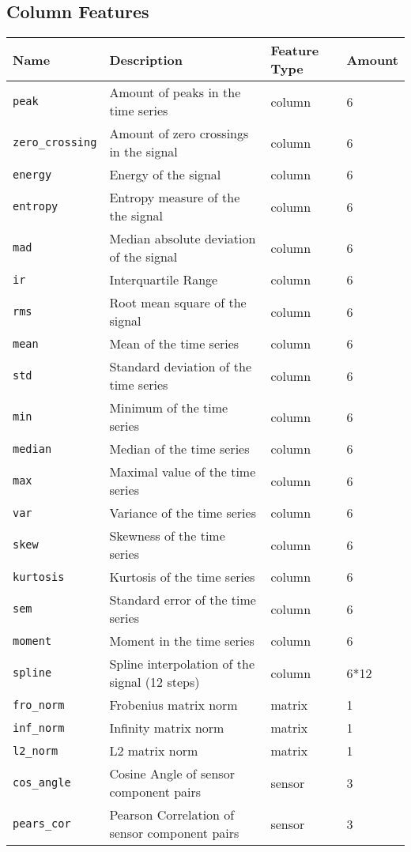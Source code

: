 \subsection{Column Features}
\begin{center}
  \begin{tabular}{ | l| l | l | l |}
  \hline
  Name & Description & Feature Type & Amount \\
  \hline
    \texttt{peak} & Amount of peaks in the time series & column  & 6 \\
    \texttt{zero\_crossing} & Amount of zero crossings in the signal & column  & 6 \\ 
    \texttt{energy} & Energy of the signal & column  & 6 \\ 
    \texttt{entropy} & Entropy measure of the the signal & column  & 6 \\
    \texttt{mad} & Median absolute deviation of the signal & column  & 6 \\
    \texttt{ir} & Interquartile Range & column  & 6 \\
    \texttt{rms} & Root mean square of the signal & column  & 6 \\
    \texttt{mean} & Mean of the time series & column  & 6 \\
    \texttt{std} & Standard deviation of the time series & column  & 6 \\
    \texttt{min} & Minimum of the time series & column  & 6 \\
    \texttt{median} & Median of the time series & column  & 6 \\
    \texttt{max} & Maximal value of the time series & column  & 6 \\
    \texttt{var} & Variance of the time series & column  & 6 \\
    \texttt{skew} & Skewness of the time series & column  & 6 \\
    \texttt{kurtosis} & Kurtosis of the time series & column  & 6 \\
    \texttt{sem} & Standard error of the time series & column  & 6 \\
    \texttt{moment} & Moment in the time series & column & 6 \\
    \texttt{spline} & Spline interpolation of the signal (12 steps) & column  & 6*12 \\
  \hline
    \texttt{fro\_norm} & Frobenius matrix norm & matrix & 1 \\
    \texttt{inf\_norm} & Infinity matrix norm & matrix & 1 \\
    \texttt{l2\_norm} & L2 matrix norm & matrix & 1 \\
  \hline
    \texttt{cos\_angle} & Cosine Angle of sensor component pairs & sensor & 3 \\
    \texttt{pears\_cor} & Pearson Correlation of sensor component pairs & sensor & 3 \\
    
  \hline
  \end{tabular}
\end{center}

